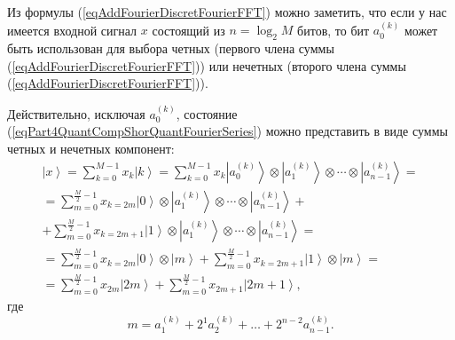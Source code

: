 Из формулы (\ref{eqAddFourierDiscretFourierFFT}) можно
заметить, что если у нас имеется входной сигнал $x$ состоящий из $n =
\log_2{M}$ 
битов, то бит $a^{(k)}_0$ может быть использован для выбора четных
(первого члена суммы (\ref{eqAddFourierDiscretFourierFFT}))
или нечетных 
(второго члена суммы (\ref{eqAddFourierDiscretFourierFFT})).

Действительно, исключая $a^{(k)}_0$, состояние
(\ref{eqPart4QuantCompShorQuantFourierSeries}) можно представить в
виде суммы четных и нечетных компонент: 
\begin{eqnarray}
\left|x\right> = \sum_{k = 0}^{M - 1}x_k \left|k\right> = 
\sum_{k = 0}^{M - 1}x_k \left|a^{(k)}_0\right> \otimes  \left|a^{(k)}_1\right>
\otimes \cdots \otimes \left|a^{(k)}_{n-1}\right> = 
\nonumber \\
 = \sum_{m = 0}^{\frac{M}{2} - 1}x_{k=2m} \left|0\right> \otimes  \left|a^{(k)}_1\right>
\otimes \cdots \otimes \left|a^{(k)}_{n-1}\right> +
\nonumber \\
+
\sum_{m = 0}^{\frac{M}{2} - 1}x_{k=2m + 1} \left|1\right> \otimes  \left|a^{(k)}_1\right>
\otimes \cdots \otimes \left|a^{(k)}_{n-1}\right> = 
\nonumber \\
 = \sum_{m = 0}^{\frac{M}{2} - 1}x_{k=2m} \left|0\right> \otimes  \left|m\right> +
\sum_{m = 0}^{\frac{M}{2} - 1}x_{k=2m + 1} \left|1\right> \otimes  \left|m\right> = 
\nonumber \\
= \sum_{m = 0}^{\frac{M}{2} - 1}x_{2m} \left|2m\right> +
\sum_{m = 0}^{\frac{M}{2} - 1}x_{2m + 1} \left|2m+1\right>,
\nonumber
\end{eqnarray}
где
\begin{equation}
m = a^{(k)}_1 + 2^1 a^{(k)}_2 + \dots + 2^{n-2} a^{(k)}_{n-1}.
\nonumber
\end{equation}



